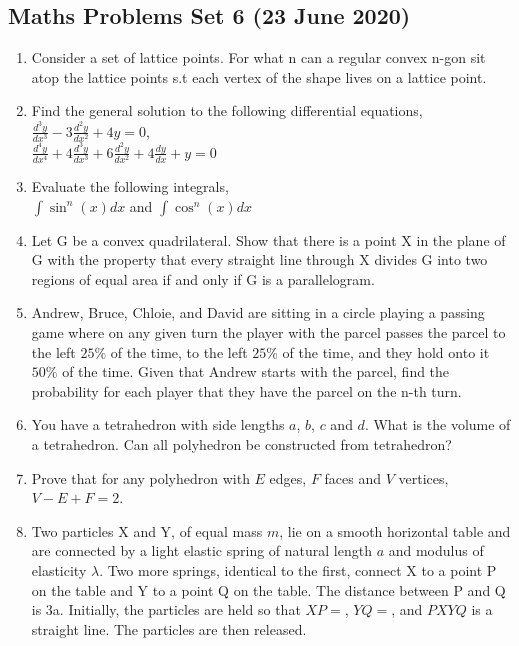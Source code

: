 \documentclass{article}
\begin{document}
\begin{center}
        \section*{Maths Problems Set 6 (23 June 2020)}
\end{center}

\begin{enumerate}
	\item
	Consider a set of lattice points. For what n can a regular convex n-gon sit atop the lattice points s.t each vertex of the shape lives on a lattice point.
	
	\item
	Find the general solution to the following differential equations,\\
	$\frac{d^{3}y}{dx^{3}} - 3\frac{d^{2}y}{dx^{2}} + 4y = 0$,\\
	$\frac{d^{4}y}{dx^{4}} + 4\frac{d^{3}y}{dx^{3}} + 6\frac{d^{2}y}{dx^{2}} + 4\frac{dy}{dx} + y = 0$
	
	\item
	Evaluate the following integrals,\\
	$\int \sin^{n}(x) dx$ and $\int \cos^{n}(x) dx$
	
    \item
    Let G be a convex quadrilateral. Show that there is a point X in the plane of G with the property that every straight line through X divides G into two regions of equal area if and only if G is a parallelogram.
    
    \item
    Andrew, Bruce, Chloie, and David are sitting in a circle playing a passing game where on any given turn the player with the parcel passes the parcel to the left $25\%$ of the time, to the left $25\%$ of the time, and they hold onto it $50\%$ of the time. Given that Andrew starts with the parcel, find the probability for each player that they have the parcel on the n-th turn.
    
    \item
    You have a tetrahedron with side lengths $a$, $b$, $c$ and $d$. What is the volume of a tetrahedron. Can all polyhedron be constructed from tetrahedron?
    
    \item
    Prove that for any polyhedron with $E$ edges, $F$ faces and $V$ vertices, $V - E + F = 2$.
    
    \item
    Two particles X and Y, of equal mass $m$, lie on a smooth horizontal table and are connected by a light elastic spring of natural length $a$ and modulus of elasticity $\lambda$. Two more springs, identical to the first, connect X to a point P on the table and Y to a point Q on the table. The distance between P and Q is 3a. Initially, the particles are held so that $XP = $, $YQ = $, and $PXYQ$ is a straight line. The particles are then released.
    

\end{enumerate}
\end{document}
